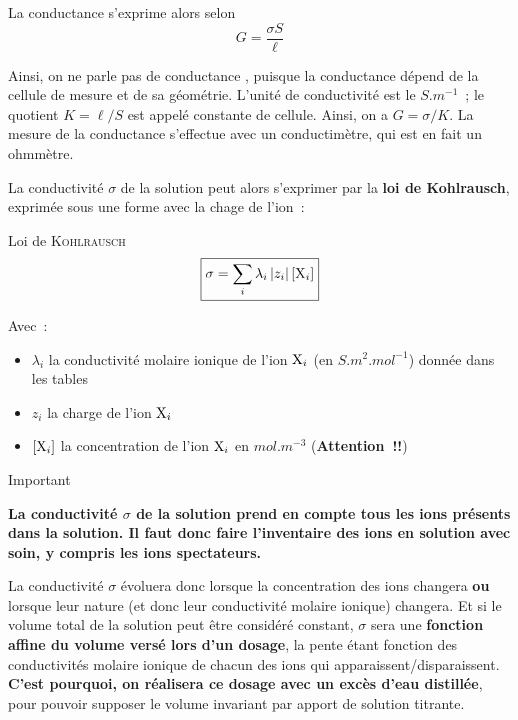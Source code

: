 \documentclass[a4paper, 10pt, final, garamond]{book}
\begin{document}
La conductance s'exprime alors selon
\[G = \frac{\sigma S}{\ell}\]

Ainsi, on ne parle pas de conductance , puisque la
conductance dépend de la cellule de mesure et de sa géométrie. L'unité de
conductivité est le $\si{S.m^{-1}}$~; le quotient $K = \ell / S$ est appelé
constante de cellule. Ainsi, on a $G = \sigma / K$. La mesure de la conductance
s'effectue avec un conductimètre, qui est en fait un ohmmètre.\bigbreak

La conductivité $\sigma$ de la solution peut alors s'exprimer par la \textbf{loi
de Kohlrausch}, exprimée sous une forme avec la chage de l'ion~:
\begin{tprop}{Loi de \textsc{Kohlrausch}}
    \[\boxed{\sigma = \sum_{i} \lambda_i \left|z_i\right| [{\rm X}_i]}\]

    Avec~:
    \begin{itemize}
        \item $\lambda_i$ la conductivité molaire ionique de l'ion ${\rm X}_i$ (en
            $\si{S.m^2.mol^{-1}}$) donnée dans les tables
        \item $z_i$ la charge de l'ion ${\rm X}_i$
        \item $[{\rm X}_i]$ la concentration de l'ion ${\rm X}_i$ en
            $\si{mol.m^{-3}}$ (\textbf{Attention~!!})
    \end{itemize}
\end{tprop}

\begin{rror}{Important}
    \begin{center}
        \bfseries
        La conductivité $\sigma$ de la solution prend en compte tous les ions
        présents dans la solution. Il faut donc faire l'inventaire des ions en
        solution avec soin, y compris les ions spectateurs.
    \end{center}
    La conductivité $\sigma$ évoluera donc lorsque la concentration des ions
    changera \textbf{ou} lorsque leur nature (et donc leur conductivité molaire
    ionique) changera. Et si le volume total de la solution peut être considéré
    constant, $\sigma$ sera une \textbf{fonction affine du volume versé lors
    d'un dosage}, la pente étant fonction des conductivités molaire ionique de
    chacun des ions qui apparaissent/disparaissent. \textbf{C'est pourquoi, on
    réalisera ce dosage avec un excès d'eau distillée}, pour pouvoir supposer le
    volume invariant par apport de solution titrante.
\end{rror}
\end{document}

